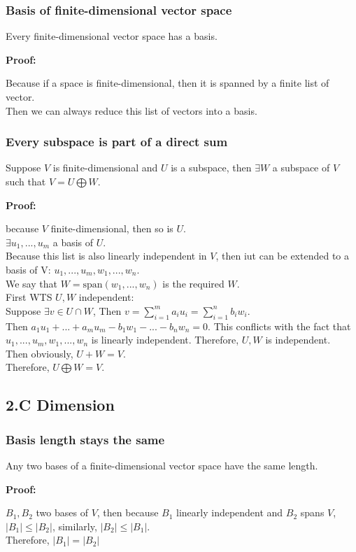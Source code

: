\documentclass{article}
\begin{document}
\subsubsection{Basis of finite-dimensional vector space}
\begin{addmargin}[1em]{0em}
    Every finite-dimensional vector space has a basis.
\end{addmargin}
\textbf{Proof:}
\begin{addmargin}[1em]{0em}
    Because if a space is finite-dimensional, then it is spanned by a finite list of vector.\\
    Then we can always reduce this list of vectors into a basis.
\end{addmargin}
\subsubsection{Every subspace is part of a direct sum}
\begin{addmargin}[1em]{0em}
    Suppose $V$ is finite-dimensional and $U$ is a subspace, then $\exists W$ a subspace of $V$ such that $V = U \bigoplus W$.
\end{addmargin}
\textbf{Proof:}
\begin{addmargin}[1em]{0em}
    because $V$ finite-dimensional, then so is $U$.\\
    $\exists u_1, ..., u_m$ a basis of $U$.\\
    Because this list is also linearly independent in $V$, then iut can be extended to a basis of V:
    $u_1, ..., u_m, w_1, ..., w_n$.\\
    We say that $W = \textrm{span}(w_1, ..., w_n)$ is the required $W$.\\
    First WTS $U, W$ independent:\\
    Suppose $\exists v \in U \cap W$,
    Then $v = \sum_{i=1}^{m} a_i u_i = \sum_{i=1}^{n} b_i w_i$.\\
    Then $a_1u_1 + ... + a_mu_m - b_1w_1 - ... - b_nw_n = 0$. This conflicts with the fact that $u_1, ..., u_m, w_1, ..., w_n$ is linearly independent. Therefore, $U, W$ is independent.\\
    Then obviously, $U + W = V$.\\
    Therefore, $U \bigoplus W = V$.
\end{addmargin}
\subsection{2.C Dimension}
\subsubsection{Basis length stays the same}
\begin{addmargin}[1em]{0em}
    Any two bases of a finite-dimensional vector space have the same length.
\end{addmargin}
\textbf{Proof:}
\begin{addmargin}[1em]{0em}
    $B_1, B_2$ two bases of $V$, then because $B_1$ linearly independent and $B_2$ spans $V$, $|B_1| \leq |B_2|$, similarly, $|B_2| \leq |B_1|$.\\
    Therefore, $|B_1| = |B_2|$
\end{addmargin}
\end{document}
